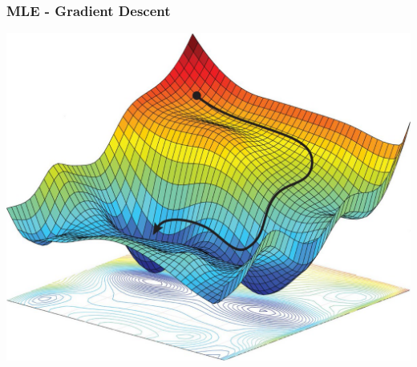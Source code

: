 \documentclass[xcolor=dvipsnames, english, 8pt]{beamer}
\begin{document}
\begin{frame}
    \frametitle{MLE - Gradient Descent}
    \begin{center}
        \includegraphics[scale=0.2]{GD}
    \end{center}

\end{frame}
\end{document}
